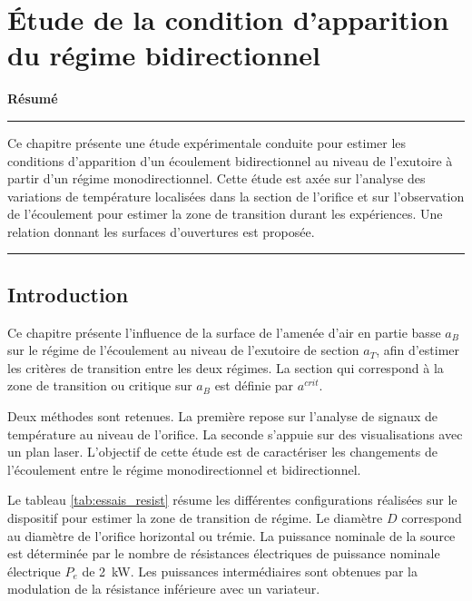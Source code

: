 \chapter{Étude de la condition d'apparition du régime bidirectionnel} \label{ch:apparition}

\localtableofcontents

\baselineskip
\noindent\textbf{\large Résumé}
\vskip 0pt
\noindent\rule{\linewidth}{.2pt}
\vskip 6pt
\noindent Ce chapitre présente une étude expérimentale conduite pour estimer les conditions d'apparition d'un écoulement bidirectionnel au niveau de l'exutoire à partir d'un régime monodirectionnel. Cette étude est axée sur l'analyse des variations de température localisées dans la section de l'orifice et sur l'observation de l'écoulement pour estimer la zone de transition durant les expériences. Une relation donnant les surfaces d'ouvertures est proposée.
\vskip 0pt
\noindent\rule{\linewidth}{.2pt}

\newpage

\section{Introduction}
Ce chapitre présente l'influence de la surface de l'amenée d'air en partie basse $a_B$ sur le régime de l'écoulement au niveau de l'exutoire de section $a_T$, afin d'estimer les critères de transition entre les deux régimes. La section qui correspond à la zone de transition ou critique sur $a_B$ est définie par $a^{crit}$.

Deux méthodes sont retenues. La première repose sur l'analyse de signaux de température au niveau de l'orifice. La seconde s’appuie sur des visualisations avec un plan laser. L'objectif de cette étude est de caractériser les changements de l'écoulement entre le régime monodirectionnel et bidirectionnel.

Le tableau \ref{tab:essais_resist} résume les différentes configurations réalisées sur le dispositif pour estimer la zone de transition de régime. Le diamètre $D$ correspond au diamètre de l'orifice horizontal ou trémie. La puissance nominale de la source est déterminée par le nombre de résistances électriques de puissance nominale électrique $P_e$ de \SI{2}{kW}. Les puissances intermédiaires sont obtenues par la modulation de la résistance inférieure avec un variateur.

